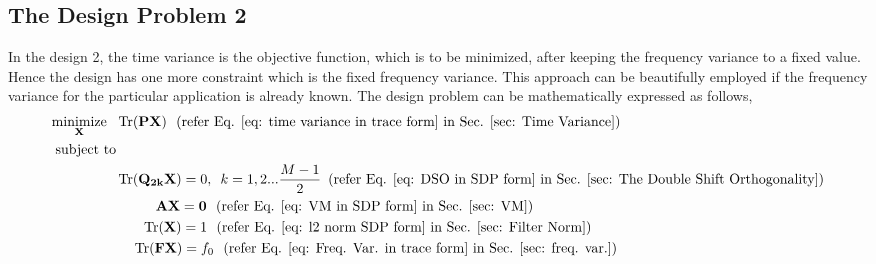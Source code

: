 \subsection{The Design Problem 2}
\label{sub: The Design Problem 2}
In the design 2, the time variance is the objective function, which is to be minimized, after keeping the frequency variance to a fixed value. Hence the design has one more constraint which is the fixed frequency variance. This approach can be beautifully employed if the frequency variance for the particular application is already known. The design problem can be mathematically expressed as follows,
\begin{eqnarray}
\begin{aligned}
\underset{\mathbf{X}} {\text{minimize}}\,\,\,\, & \operatorname{Tr}(\mathbf{PX})\,\,\,\,  (\text{refer Eq. \ref{eq: time variance in trace form} in Sec. \ref{sec: Time Variance}})
\\ \text{subject to} &\\
& \operatorname{Tr}(\mathbf{Q_{2k}X}) = {0}, \,\,\, k=1,2...\frac{M-1}{2} \,\,\,(\text{refer Eq. \ref{eq: DSO in SDP form} in Sec. \ref{sec: The Double Shift Orthogonality}})
\\&\,\,\,\,\,\,\,\,\,\,\,\,\,\,\,\,\, \mathbf{AX} = \mathbf{0} \,\,\,\, (\text{refer Eq. \ref{eq: VM in SDP form} in Sec. \ref{sec: VM}}) 
\\&\,\,\,\,\,\,\,\,\,\,\, \operatorname{Tr}(\mathbf{X}) = {1} \,\,\,\, (\text{refer Eq. \ref{eq: l2 norm SDP form} in Sec. \ref{sec: Filter Norm}})
\\ &\,\,\,\,\,\,\, \operatorname{Tr}(\mathbf{FX}) = f_0 \,\,\,\, (\text{refer Eq. \ref{eq: Freq. Var. in trace form} in Sec. \ref{sec: freq. var.}})
\end{aligned}
\end{eqnarray}

